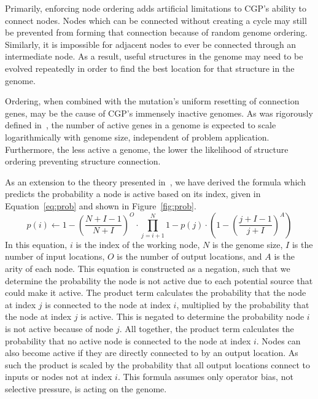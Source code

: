 \documentclass[journal]{IEEEtran}
\begin{document}
Primarily, enforcing node ordering adds artificial limitations to CGP's ability to
connect nodes.  Nodes which can be connected without creating a cycle may
still be prevented from forming that connection because of random genome ordering.
Similarly, it is impossible for adjacent nodes
to ever be connected through an intermediate node.  As a result, useful structures
in the genome may need to be evolved repeatedly in order to find the best
location for that structure in the genome.

Ordering, when combined with the mutation's uniform resetting of connection genes, may be the cause of CGP's
immensely inactive genomes.  As was rigorously defined in~\cite{goldman:2013:ordering},
the number of active genes in a genome is expected to scale logarithmically
with genome size, independent of problem application.  Furthermore, the less
active a genome, the lower the likelihood of structure ordering preventing structure
connection.

As an extension to the theory presented in~\cite{goldman:2013:ordering}, we have
derived the formula which predicts the probability a node is active based on its
index, given in Equation~\ref{eq:prob} and shown in Figure~\ref{fig:prob}.
\begin{equation}
p(i) \leftarrow 1 - (\frac{N+I-1}{N+I})^O \cdot \prod_{j=i+1}^{N} 1 - p(j) \cdot (1-(\frac{j+I-1}{j+I})^A)
\label{eq:prob}
\end{equation}
In this equation, $i$ is the index of the working node, $N$ is the genome size, $I$ is the number of input locations,
$O$ is the number of output locations, and $A$ is the arity of each node.
This equation is constructed as a negation, such that we determine the probability
the node is not active due to each potential source that could make it active.
The product term calculates the probability that the node at index $j$ is connected to the
node at index $i$, multiplied by the probability that the node at index $j$ is active.  This is
negated to determine the probability node $i$ is not active because of node $j$.
All together, the product term calculates the probability that no active node is
connected to the node at index $i$.  Nodes can also become active if they are directly
connected to by an output location.  As such the product is scaled by the probability
that all output locations connect to inputs or nodes not at index $i$.  This
formula assumes only operator bias, not selective pressure, is acting on the
genome.
\end{document}
